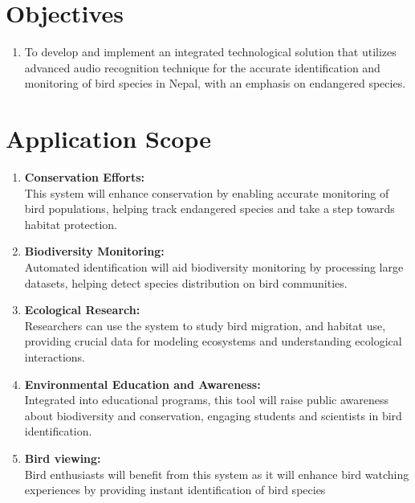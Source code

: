 \section{Objectives}
\begin{enumerate}[label=\roman*]
    \item To develop and implement an integrated technological solution that
          utilizes
          advanced audio recognition technique for
          the accurate
          identification and monitoring of bird species in Nepal, with an
          emphasis on
          endangered species.
\end{enumerate}

\section{Application Scope}
\begin{enumerate}
    \item \textbf{Conservation Efforts:}\\This system will enhance conservation
          by enabling accurate monitoring
          of bird populations, helping track endangered species and take a step
          towards habitat protection.
    \item \textbf{Biodiversity Monitoring:}\\Automated identification will aid
          biodiversity monitoring by
          processing large datasets, helping detect species distribution on
          bird communities.
    \item \textbf{Ecological Research:}\\ Researchers can use the system to
          study bird migration,
          and habitat use, providing crucial data for modeling ecosystems and
          understanding ecological interactions.
    \item \textbf{Environmental Education and Awareness:}\\Integrated into
          educational programs, this tool will
          raise public awareness about biodiversity and conservation, engaging
          students and scientists in bird identification.
    \item \textbf{Bird viewing:}\\Bird enthusiasts will benefit from this
          system as it will enhance bird watching
          experiences by providing instant identification of bird species
\end{enumerate}
